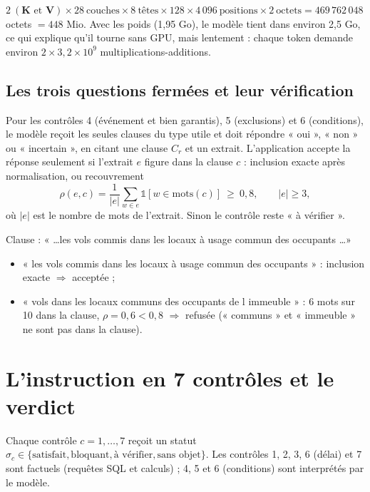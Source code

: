 \documentclass[11pt,a4paper]{article}
\newcommand{\mat}[1]{\mathbf{#1}}
\begin{document}
\begin{exemple}[(mémoire du cache KV, \texttt{num\_ctx} = 4\,096)]
$2\ (\mat{K}\text{ et }\mat{V})\times 28\ \text{couches}\times 8\ \text{têtes}\times128\times4\,096\ \text{positions}\times2\ \text{octets} = 469\,762\,048$ octets
$= 448$ Mio. Avec les poids (1,95 Go), le modèle tient dans environ 2,5 Go, ce qui explique
qu'il tourne sans GPU, mais lentement : chaque token demande environ $2\times3{,}2\times10^9$
multiplications-additions.
\end{exemple}

\subsection{Les trois questions fermées et leur vérification}
Pour les contrôles 4 (événement et bien garantis), 5 (exclusions) et 6 (conditions), le modèle
reçoit les seules clauses du type utile et doit répondre « oui », « non » ou « incertain », en
citant une clause $C_r$ et un extrait. L'application accepte la réponse seulement si l'extrait
$e$ figure dans la clause $c$ : inclusion exacte après normalisation, ou recouvrement
\[
\rho(e,c) = \frac{1}{|e|}\sum_{w \in e}\mathbb{1}[w \in \mathrm{mots}(c)] \ \ge\ 0{,}8 ,
\qquad |e|\ge 3 ,
\]
où $|e|$ est le nombre de mots de l'extrait. Sinon le contrôle reste « à vérifier ».

\begin{exemple}
Clause : « \dots les vols commis dans les locaux à usage commun des occupants \dots »
\begin{itemize}
\item « les vols commis dans les locaux à usage commun des occupants » : inclusion exacte $\Rightarrow$ acceptée ;
\item « vols dans les locaux communs des occupants de l immeuble » : 6 mots sur 10 dans la clause,
$\rho=0{,}6<0{,}8$ $\Rightarrow$ refusée (« communs » et « immeuble » ne sont pas dans la clause).
\end{itemize}
\end{exemple}

\section{L'instruction en 7 contrôles et le verdict}

Chaque contrôle $c=1,\dots,7$ reçoit un statut $\sigma_c\in\{\text{satisfait},\text{bloquant},
\text{à vérifier},\text{sans objet}\}$. Les contrôles 1, 2, 3, 6 (délai) et 7 sont factuels
(requêtes SQL et calculs) ; 4, 5 et 6 (conditions) sont interprétés par le modèle.
\end{document}
